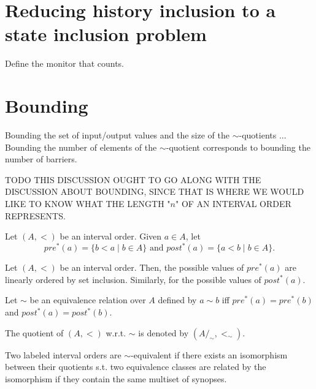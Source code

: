 

\section{Reducing history inclusion to a state inclusion problem}

Define the monitor that counts.
 
\section{Bounding}

Bounding the set of input/output values and the size of the $\sim$-quotients ... Bounding the number of elements of the $\sim$-quotient corresponds to bounding the number of barriers.


TODO THIS DISCUSSION OUGHT TO GO ALONG WITH THE DISCUSSION ABOUT BOUNDING,
SINCE THAT IS WHERE WE WOULD LIKE TO KNOW WHAT THE LENGTH "$n$" OF AN INTERVAL
ORDER REPRESENTS.

Let $(A,<)$ be an interval order.
Given $a\in A$, let 
\[
pre^*(a)=\{b < a\mid b\in A\}\mbox{ and }post^*(a)=\{a < b\mid b\in A\}.
\]

\begin{lemma}

  Let $(A,<)$ be an interval order. Then, the possible values of $pre^*(a)$ are
  linearly ordered by set inclusion. Similarly, for the possible values of
  $post^*(a)$.

\end{lemma}

Let $\sim$ be an equivalence relation over $A$ defined by $a\sim b$ iff
$pre^*(a)=pre^*(b)$ and $post^*(a)=post^*(b)$.

The quotient of $(A,<)$ w.r.t. $\sim$ is denoted by $(A/_\sim,<_\sim)$.

Two labeled interval orders are $\sim$-equivalent if there exists an
isomorphism between their quotients s.t. two equivalence classes are related by
the isomorphism if they contain the same multiset of synopses.

